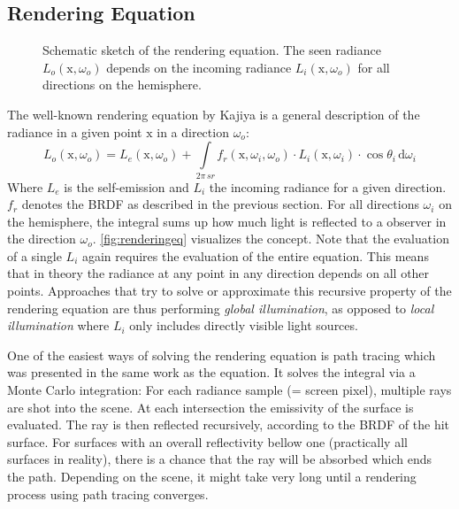 \documentclass[thesis.tex]{subfiles}
\begin{document}
\subsection{Rendering Equation} \label{sec:preq:renderingeq}
\begin{figure}[h]
\centering
{}
\caption{Schematic sketch of the rendering equation. The seen radiance $L_o(\mathrm{x}, \omega_o)$ depends on the incoming radiance $L_i(\mathrm{x}, \omega_o)$ for all directions on the hemisphere.}
\label{fig:renderingeq}
\end{figure}
The well-known rendering equation by Kajiya \cite{bib:renderingequation} is a general description of the radiance in a given point $\mathrm{x}$ in a direction $\omega_o$:
\begin{equation}
L_o(\mathrm{x}, \omega_o) = L_e(\mathrm{x}, \omega_o) + \int\limits_{2\pi\,sr} f_r(\mathrm{x}, \omega_i, \omega_o) \cdot L_i(\mathrm{x}, \omega_i) \cdot \cos\theta_i \, \mathrm{d}\omega_i
\end{equation}
Where $L_e$ is the self-emission and $L_i$ the incoming radiance for a given direction.
$f_r$ denotes the BRDF as described in the previous section.
For all directions $\omega_i$ on the hemisphere, the integral sums up how much light is reflected to a observer in the direction $\omega_o$.
\autoref{fig:renderingeq} visualizes the concept.
Note that the evaluation of a single $L_i$ again requires the evaluation of the entire equation.
This means that in theory the radiance at any point in any direction depends on all other points.
Approaches that try to solve or approximate this recursive property of the rendering equation are thus performing \emph{global illumination}, as opposed to \emph{local illumination} where $L_i$ only includes directly visible light sources.

One of the easiest ways of solving the rendering equation is path tracing which was presented in the same work as the equation.
It solves the integral via a Monte Carlo integration:
For each radiance sample (= screen pixel), multiple rays are shot into the scene.
At each intersection the emissivity of the surface is evaluated. 
The ray is then reflected recursively, according to the BRDF of the hit surface.
For surfaces with an overall reflectivity bellow one (practically all surfaces in reality), there is a chance that the ray will be absorbed which ends the path.
Depending on the scene, it might take very long until a rendering process using path tracing converges.
\end{document}
